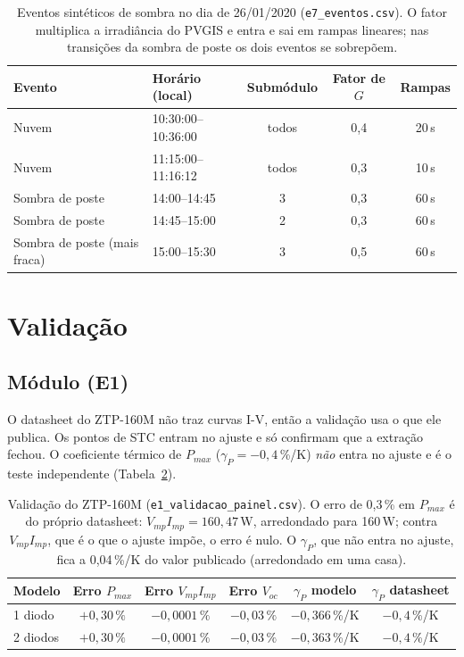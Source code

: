 \documentclass[3p,authoryear]{elsarticle}
\begin{document}
\begin{table}[!htbp]
\centering\small
\begin{tabular}{l l c c c}
\toprule
Evento & Horário (local) & Submódulo & Fator de $G$ & Rampas \\
\midrule
Nuvem & 10:30:00--10:36:00 & todos & 0,4 & 20\,s \\
Nuvem & 11:15:00--11:16:12 & todos & 0,3 & 10\,s \\
Sombra de poste & 14:00--14:45 & 3 & 0,3 & 60\,s \\
Sombra de poste & 14:45--15:00 & 2 & 0,3 & 60\,s \\
Sombra de poste (mais fraca) & 15:00--15:30 & 3 & 0,5 & 60\,s \\
\bottomrule
\end{tabular}
\caption{Eventos sintéticos de sombra no dia de 26/01/2020 (\texttt{e7\_eventos.csv}). O
fator multiplica a irradiância do PVGIS e entra e sai em rampas lineares; nas transições da
sombra de poste os dois eventos se sobrepõem.}
\label{tab:eventos}
\end{table}

\section{Validação}
\label{sec:validacao}

\subsection{Módulo (E1)}
\label{sec:val_painel}

O datasheet do ZTP-160M não traz curvas I-V, então a validação usa o que ele publica. Os
pontos de STC entram no ajuste e só confirmam que a extração fechou. O coeficiente térmico de
$P_{max}$ ($\gamma_P = -0{,}4$\,\%/K) \emph{não} entra no ajuste e é o teste independente
(Tabela~\ref{tab:e1}).

\begin{table}[!htbp]
\centering\small
\begin{tabular}{lccccc}
\toprule
Modelo & Erro $P_{max}$ & Erro $V_{mp}I_{mp}$ & Erro $V_{oc}$ &
$\gamma_P$ modelo & $\gamma_P$ datasheet \\
\midrule
1 diodo  & $+0{,}30\,\%$ & $-0{,}0001\,\%$ & $-0{,}03\,\%$ & $-0{,}366$\,\%/K & $-0{,}4$\,\%/K \\
2 diodos & $+0{,}30\,\%$ & $-0{,}0001\,\%$ & $-0{,}03\,\%$ & $-0{,}363$\,\%/K & $-0{,}4$\,\%/K \\
\bottomrule
\end{tabular}
\caption{Validação do ZTP-160M (\texttt{e1\_validacao\_painel.csv}). O erro de 0,3\,\% em
$P_{max}$ é do próprio datasheet: $V_{mp}I_{mp} = 160{,}47$\,W, arredondado para 160\,W; contra
$V_{mp}I_{mp}$, que é o que o ajuste impõe, o erro é nulo. O $\gamma_P$, que não entra no
ajuste, fica a 0,04\,\%/K do valor publicado (arredondado em uma casa).}
\label{tab:e1}
\end{table}
\end{document}
